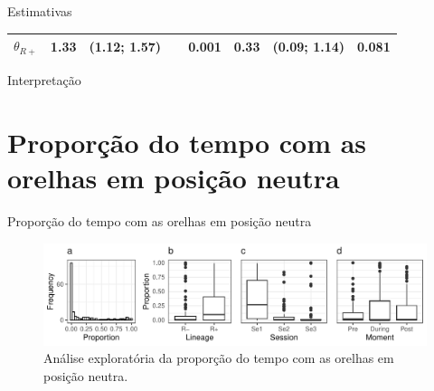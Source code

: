 \documentclass[
  ignorenonframetext,
  serif,
  professionalfont,
  usenames,
  dvipsnames,
  aspectratio = 169]{beamer}
\begin{document}
\begin{frame}{Estimativas}
\begin{table}[h]
\begin{tabular}{lcclccc}
        \multicolumn{1}{l|}{$\theta_{R+}$}   & {\color[HTML]{000000} 1.33}  & {\color[HTML]{000000} (1.12; 1.57)}   & \multicolumn{1}{l|}{{\color[HTML]{000000} \ \  0.001}} & {\color[HTML]{000000} 0.33}  & {\color[HTML]{000000} (0.09; 1.14)}   & {\color[HTML]{000000} 0.081}                                \\ \hline
    \end{tabular}
    \label{tab:est1}
\end{table}
\end{frame}

\begin{frame}{Interpretação}
\protect\hypertarget{interpretauxe7uxe3o}{}
\end{frame}

\hypertarget{proporuxe7uxe3o-do-tempo-com-as-orelhas-em-posiuxe7uxe3o-neutra}{%
\section{Proporção do tempo com as orelhas em posição
neutra}\label{proporuxe7uxe3o-do-tempo-com-as-orelhas-em-posiuxe7uxe3o-neutra}}

\begin{frame}{Proporção do tempo com as orelhas em posição neutra}
\protect\hypertarget{proporuxe7uxe3o-do-tempo-com-as-orelhas-em-posiuxe7uxe3o-neutra-1}{}
\begin{figure}

{\centering \includegraphics[width=0.95\linewidth]{./img/prop} 

}

\caption{Análise exploratória da proporção do tempo com as orelhas em posição neutra.}\label{fig:unnamed-chunk-12}
\end{figure}
\end{frame}

\begin{frame}{}
\protect\hypertarget{section}{}
\end{frame}
\end{document}
